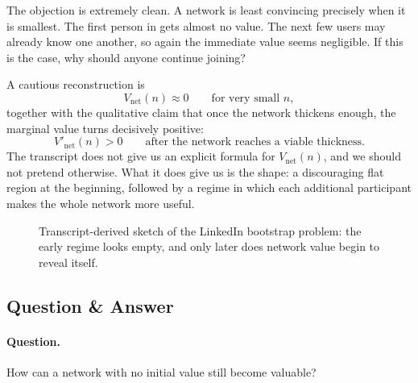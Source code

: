 The objection is extremely clean. A network is least convincing precisely when it is smallest. The first person in gets almost no value. The next few users may already know one another, so again the immediate value seems negligible. If this is the case, why should anyone continue joining?

A cautious reconstruction is
\begin{equation}
V_{\mathrm{net}}(n)\approx 0 \qquad \text{for very small } n,
\end{equation}
together with the qualitative claim that once the network thickens enough, the marginal value turns decisively positive:
\begin{equation}
V'_{\mathrm{net}}(n) > 0 \qquad \text{after the network reaches a viable thickness.}
\end{equation}
The transcript does not give us an explicit formula for \(V_{\mathrm{net}}(n)\), and we should not pretend otherwise. What it does give us is the shape: a discouraging flat region at the beginning, followed by a regime in which each additional participant makes the whole network more useful.

\begin{figure}
\begin{center}

{\small Transcript-derived sketch of the LinkedIn bootstrap problem: the early regime looks empty, and only later does network value begin to reveal itself.}
\end{center}
\end{figure}

\subsection{Question \& Answer}

\paragraph{Question.}
How can a network with no initial value still become valuable?

